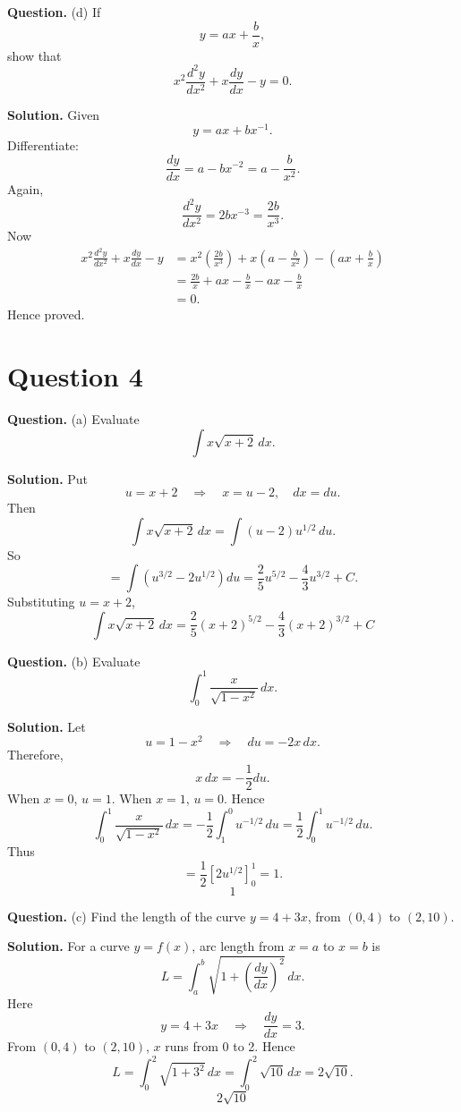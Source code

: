 \documentclass[11pt,a4paper]{article}
\newcommand{\question}[1]{\begin{questionbox}\textbf{Question.} #1\end{questionbox}}
\newcommand{\answer}{\begin{answerbox}\textbf{Solution.} }
\newcommand{\eanswer}{\end{answerbox}}
\newcommand{\finalans}[1]{\[\boxed{#1}\]}
\begin{document}
\question{(d) If
\[
y=ax+\frac{b}{x},
\]
show that
\[
x^2\frac{d^2y}{dx^2}+x\frac{dy}{dx}-y=0.
\]}
\answer
Given
\[
y=ax+bx^{-1}.
\]
Differentiate:
\[
\frac{dy}{dx}=a-bx^{-2}=a-\frac{b}{x^2}.
\]
Again,
\[
\frac{d^2y}{dx^2}=2bx^{-3}=\frac{2b}{x^3}.
\]
Now
\begin{align*}
x^2\frac{d^2y}{dx^2}+x\frac{dy}{dx}-y
&=x^2\left(\frac{2b}{x^3}\right)+x\left(a-\frac{b}{x^2}\right)-\left(ax+\frac{b}{x}\right)\\
&=\frac{2b}{x}+ax-\frac{b}{x}-ax-\frac{b}{x}\\
&=0.
\end{align*}
Hence proved.
\eanswer

\section*{Question 4}

\question{(a) Evaluate
\[
\int x\sqrt{x+2}\,dx.
\]}
\answer
Put
\[
u=x+2\quad\Rightarrow\quad x=u-2,\quad dx=du.
\]
Then
\[
\int x\sqrt{x+2}\,dx=\int (u-2)u^{1/2}\,du.
\]
So
\[
=\int \left(u^{3/2}-2u^{1/2}\right)du
=\frac{2}{5}u^{5/2}-\frac{4}{3}u^{3/2}+C.
\]
Substituting \(u=x+2\),
\finalans{\int x\sqrt{x+2}\,dx=\frac{2}{5}(x+2)^{5/2}-\frac{4}{3}(x+2)^{3/2}+C}
\eanswer

\question{(b) Evaluate
\[
\int_0^1\frac{x}{\sqrt{1-x^2}}\,dx.
\]}
\answer
Let
\[
u=1-x^2\quad\Rightarrow\quad du=-2x\,dx.
\]
Therefore,
\[
x\,dx=-\frac12du.
\]
When \(x=0\), \(u=1\). When \(x=1\), \(u=0\). Hence
\[
\int_0^1\frac{x}{\sqrt{1-x^2}}\,dx
=-\frac12\int_1^0u^{-1/2}\,du
=\frac12\int_0^1u^{-1/2}\,du.
\]
Thus
\[
=\frac12\left[2u^{1/2}\right]_0^1=1.
\]
\finalans{1}
\eanswer

\question{(c) Find the length of the curve \(y=4+3x\), from \((0,4)\) to \((2,10)\).}
\answer
For a curve \(y=f(x)\), arc length from \(x=a\) to \(x=b\) is
\[
L=\int_a^b\sqrt{1+\left(\frac{dy}{dx}\right)^2}\,dx.
\]
Here
\[
y=4+3x\quad\Rightarrow\quad \frac{dy}{dx}=3.
\]
From \((0,4)\) to \((2,10)\), \(x\) runs from 0 to 2. Hence
\[
L=\int_0^2\sqrt{1+3^2}\,dx=\int_0^2\sqrt{10}\,dx=2\sqrt{10}.
\]
\finalans{2\sqrt{10}}
\begin{center}
\end{center}
\eanswer
\end{document}
